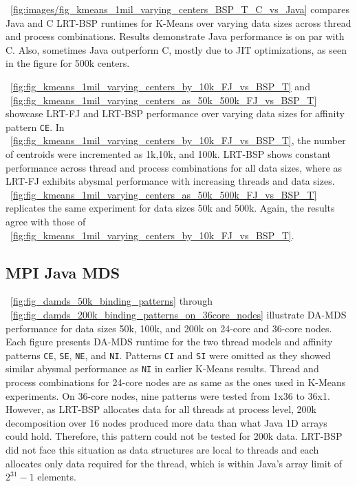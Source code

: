 \documentclass[10pt, conference, compsocconf]{IEEEtran}
\begin{document}
\figurename~\ref{fig:images/fig_kmeans_1mil_varying_centers_BSP_T_C_vs_Java} compares Java and C \ac{LRT-BSP} runtimes for K-Means over varying data sizes across thread and process combinations. Results demonstrate Java performance is on par with C. Also, sometimes Java outperform C, mostly due to \ac{JIT} optimizations, as seen in the figure for 500k centers. 

\figurename~\ref{fig:fig_kmeans_1mil_varying_centers_by_10k_FJ_vs_BSP_T} and \figurename~\ref{fig:fig_kmeans_1mil_varying_centers_as_50k_500k_FJ_vs_BSP_T} showcase \ac{LRT-FJ} and \ac{LRT-BSP} performance over varying data sizes for affinity pattern \texttt{CE}. In \figurename~\ref{fig:fig_kmeans_1mil_varying_centers_by_10k_FJ_vs_BSP_T}, the number of centroids were incremented as 1k,10k, and 100k. \ac{LRT-BSP} shows constant performance across thread and process combinations for all data sizes, where as \ac{LRT-FJ} exhibits abysmal performance with increasing threads and data sizes. \figurename~\ref{fig:fig_kmeans_1mil_varying_centers_as_50k_500k_FJ_vs_BSP_T} replicates the same experiment for data sizes 50k and 500k. Again, the results agree with those of \figurename~\ref{fig:fig_kmeans_1mil_varying_centers_by_10k_FJ_vs_BSP_T}.

\subsection{MPI Java \ac{MDS}}
\figurename~\ref{fig:fig_damds_50k_binding_patterns} through \figurename~\ref{fig:fig_damds_200k_binding_patterns_on_36core_nodes} illustrate \ac{DA-MDS} performance for data sizes 50k, 100k, and 200k on 24-core and 36-core nodes. Each figure presents \ac{DA-MDS} runtime for the two thread models and affinity patterns \texttt{CE}, \texttt{SE}, \texttt{NE}, and \texttt{NI}. Patterns \texttt{CI} and \texttt{SI} were omitted as they showed similar abysmal performance as \texttt{NI} in earlier K-Means results. Thread and process combinations for 24-core nodes are as same as the ones used in K-Means experiments. On 36-core nodes, nine patterns were tested from 1x36 to 36x1. However, as \ac{LRT-BSP} allocates data for all threads at process level, 200k decomposition over 16 nodes produced more data than what Java 1D arrays could hold. Therefore, this pattern could not be tested for 200k data. \ac{LRT-BSP} did not face this situation as data structures are local to threads and each allocates only data required for the thread, which is within Java's array limit of $2^{31} - 1$ elements.
\end{document}
